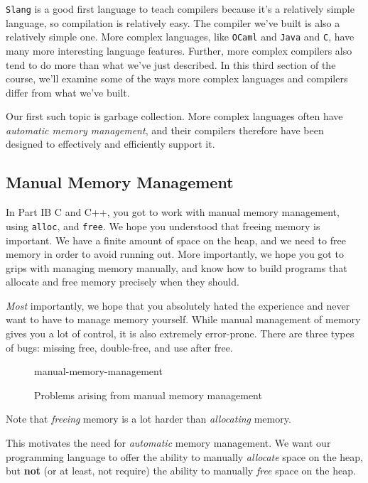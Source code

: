 \texttt{Slang} is a good first language to teach compilers because it's a relatively simple language, so compilation is relatively easy. The compiler we've built is also a relatively simple one. More complex languages, like \texttt{OCaml} and \texttt{Java} and \texttt{C}, have many more interesting language features. Further, more complex compilers also tend to do more than what we've just described. In this third section of the course, we'll examine some of the ways more complex languages and compilers differ from what we've built.

Our first such topic is garbage collection. More complex languages often have \textit{automatic memory management}, and their compilers therefore have been designed to effectively and efficiently support it.

\subsection{Manual Memory Management}
In \textsf{Part IB C and C++}, you got to work with manual memory management, using \texttt{alloc}, and \texttt{free}. We hope you understood that freeing memory is important. We have a finite amount of space on the heap, and we need to free memory in order to avoid running out. More importantly, we hope you got to grips with managing memory manually, and know how to build programs that allocate and free memory precisely when they should. 

\textit{Most} importantly, we hope that you absolutely hated the experience and never want to have to manage memory yourself. While manual management of memory gives you a lot of control, it is also extremely error-prone. There are three types of bugs: missing free, double-free, and use after free.

\begin{figure}[H]
    \centering
    {manual-memory-management}
    \caption{Problems arising from manual memory management}
    \label{fig:manual-memory-management}
\end{figure}

Note that \textit{freeing} memory is a lot harder than \textit{allocating} memory.

This motivates the need for \textit{automatic} memory management. We want our programming language to offer the ability to manually \textit{allocate} space on the heap, but \textbf{not} (or at least, not require) the ability to manually \textit{free} space on the heap.

